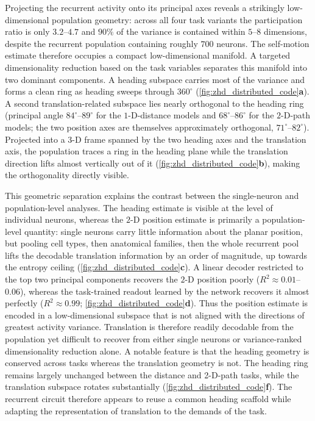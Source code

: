 \documentclass[11pt]{article}
\begin{document}
Projecting the recurrent activity onto its principal axes reveals a strikingly low-dimensional population geometry: across all four task variants the participation ratio is only $3.2$--$4.7$ and $90\%$ of the variance is contained within $5$--$8$ dimensions, despite the recurrent population containing roughly $700$ neurons. The self-motion estimate therefore occupies a compact low-dimensional manifold. A targeted dimensionality reduction based on the task variables separates this manifold into two dominant components. A heading subspace carries most of the variance and forms a clean ring as heading sweeps through $360^\circ$ (\cref{fig:zhd_distributed_code}\textbf{a}). A second translation-related subspace lies nearly orthogonal to the heading ring (principal angle $84^\circ$--$89^\circ$ for the $1$-D-distance models and $68^\circ$--$86^\circ$ for the $2$-D-path models; the two position axes are themselves approximately orthogonal, $71^\circ$--$82^\circ$). Projected into a $3$-D frame spanned by the two heading axes and the translation axis, the population traces a ring in the heading plane while the translation direction lifts almost vertically out of it (\cref{fig:zhd_distributed_code}\textbf{b}), making the orthogonality directly visible.

This geometric separation explains the contrast between the single-neuron and population-level analyses. The heading estimate is visible at the level of individual neurons, whereas the $2$-D position estimate is primarily a population-level quantity: single neurons carry little information about the planar position, but pooling cell types, then anatomical families, then the whole recurrent pool lifts the decodable translation information by an order of magnitude, up towards the entropy ceiling (\cref{fig:zhd_distributed_code}\textbf{c}). A linear decoder restricted to the top two principal components recovers the $2$-D position poorly ($R^2\approx0.01$--$0.06$), whereas the task-trained readout learned by the network recovers it almost perfectly ($R^2\approx0.99$; \cref{fig:zhd_distributed_code}\textbf{d}). Thus the position estimate is encoded in a low-dimensional subspace that is not aligned with the directions of greatest activity variance. Translation is therefore readily decodable from the population yet difficult to recover from either single neurons or variance-ranked dimensionality reduction alone. A notable feature is that the heading geometry is conserved across tasks whereas the translation geometry is not. The heading ring remains largely unchanged between the distance and 2-D-path tasks, while the translation subspace rotates substantially (\cref{fig:zhd_distributed_code}\textbf{f}). The recurrent circuit therefore appears to reuse a common heading scaffold while adapting the representation of translation to the demands of the task.
\end{document}
